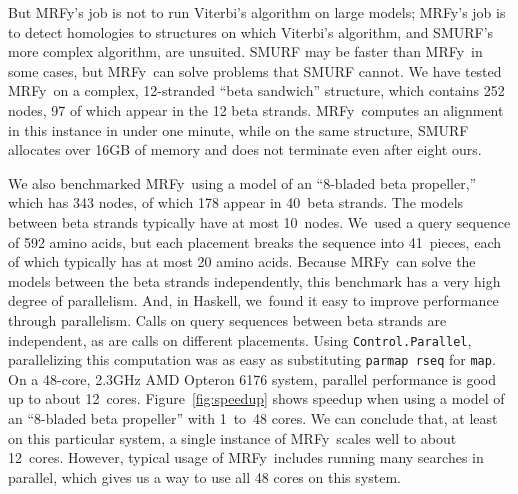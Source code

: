 \documentclass[preprint,nonatbib,blockstyle,times]{sigplanconf}
\newcommand\mrfy{MRFy} %
\newcommand\figref[1]{Figure~\ref{#1}}
\begin{document}
But \mrfy's job is not to run Viterbi's algorithm on large models;
\mrfy's job is to detect homologies to structures on which Viterbi's
algorithm, and SMURF's more complex algorithm, are unsuited.
SMURF may be faster than \mrfy\ in some cases,
but \mrfy\ can solve problems that SMURF cannot.
We have tested \mrfy\ on a complex, 12-stranded ``beta sandwich''
structure, which contains 252 nodes,
97 of which appear in the 12 beta strands.
\mrfy\ computes an alignment in this instance in under one minute,
while on the same structure, SMURF allocates
over 16GB of memory and does not terminate even after eight ours.

We also benchmarked \mrfy\ using a model of an ``8-bladed beta propeller,''
which has 343 nodes, of which 178 appear in 40~beta strands.
The models between beta strands typically have at most 10~nodes.
We~used a query sequence of 592 amino acids, but each placement breaks
the sequence into 41~pieces, each of which typically has at most 20 amino
acids.
Because \mrfy\ can solve the models between the beta strands independently,
this benchmark has a very high degree of parallelism.
And, in Haskell, we~found it easy
to improve performance through parallelism.
Calls on query sequences between beta strands are independent,
as are calls on different placements.
Using
\texttt{Control.Parallel}, parallelizing this computation was as easy
as  substituting
\texttt{parmap rseq} for \texttt{map}.
On a 48-core, 2.3GHz AMD Opteron 6176 system, 
parallel performance is good up to about 12~cores.
\figref{fig:speedup} shows speedup when
using a model of an ``8-bladed beta propeller'' with 1~to~48 cores.
We can conclude that, at least on this particular system,
a single instance of \mrfy\ scales well to about 12~cores.
However, typical usage of \mrfy\ includes running many searches
in parallel, which gives us a way to use all 48 cores on this system.



\end{document}
